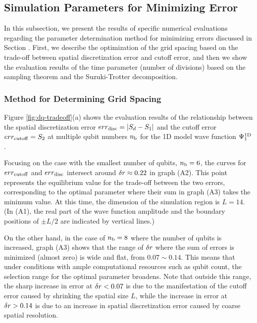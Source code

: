 \documentclass[jctc-draft.tex]{subfiles}
\begin{document}
\subsection{Simulation Parameters for Minimizing Error}
\label{subsec:parameter-selection-for-minimum-error-results}
In this subsection, we present the results of specific numerical evaluations
regarding the parameter determination method for minimizing errors discussed in
Section . First, we describe the
optimization of the grid spacing based on the trade-off between spatial
discretization error and cutoff error, and then we show the evaluation results
of the time parameter (number of divisions) based on the sampling theorem and
the Suzuki-Trotter decomposition.

\subsubsection{Method for Determining Grid Spacing}
\label{subsubsec:delta-r-selection-results}

Figure \ref{fig:dq-tradeoff}(a) shows the evaluation results of the relationship
between the spatial discretization error $err_{\mathrm{disc}} = |S_d-S_1|$ and the cutoff
error $err_{\mathrm{cutoff}} = S_2$ at multiple qubit numbers $n_{\mathrm{b}}$ for the 1D model wave
function $\Psi^{\mathrm{1D}}_1$.

Focusing on the case with the smallest number of qubits, $n_{\mathrm{b}}=6$, the curves for
$err_{\mathrm{cutoff}}$ and $err_{\mathrm{disc}}$ intersect around $\delta r \approx 0.22$ in graph
(A2). This point represents the equilibrium value for the trade-off between the
two errors, corresponding to the optimal parameter where their sum in graph (A3)
takes the minimum value. At this time, the dimension of the simulation region is
$L=14$. (In (A1), the real part of the wave function amplitude and the boundary
positions of $\pm L/2$ are indicated by vertical lines.)

On the other hand, in the case of $n_{\mathrm{b}}=8$ where the number of qubits is
increased, graph (A3) shows that the range of $\delta r$ where the sum of errors
is minimized (almost zero) is wide and flat, from $0.07 \sim 0.14$. This means
that under conditions with ample computational resources such as qubit count,
the selection range for the optimal parameter broadens. Note that outside this
range, the sharp increase in error at $\delta r < 0.07$ is due to the
manifestation of the cutoff error caused by shrinking the spatial size $L$,
while the increase in error at $\delta r > 0.14$ is due to an increase in spatial
discretization error caused by coarse spatial resolution.
\end{document}
